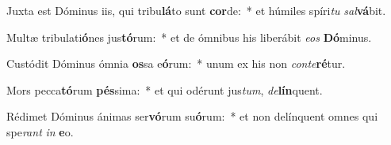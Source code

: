 \item Juxta est Dóminus iis, qui tribu\textbf{lá}to sunt \textbf{cor}de:~* et húmiles spíri\textit{tu} \textit{sal}\textbf{vá}bit.
\item Multæ tribulati\textbf{ó}nes jus\textbf{tó}rum:~* et de ómnibus his liberábit \textit{e}\textit{os} \textbf{Dó}minus.
\item Custódit Dóminus ómnia \textbf{os}sa e\textbf{ó}rum:~* unum ex his non \textit{con}\textit{te}\textbf{ré}tur.
\item Mors pecca\textbf{tó}rum \textbf{pés}sima:~* et qui odérunt jus\textit{tum}, \textit{de}\textbf{lín}quent.
\item Rédimet Dóminus ánimas ser\textbf{vó}rum su\textbf{ó}rum:~* et non delínquent omnes qui spe\textit{rant} \textit{in} \textbf{e}o.
